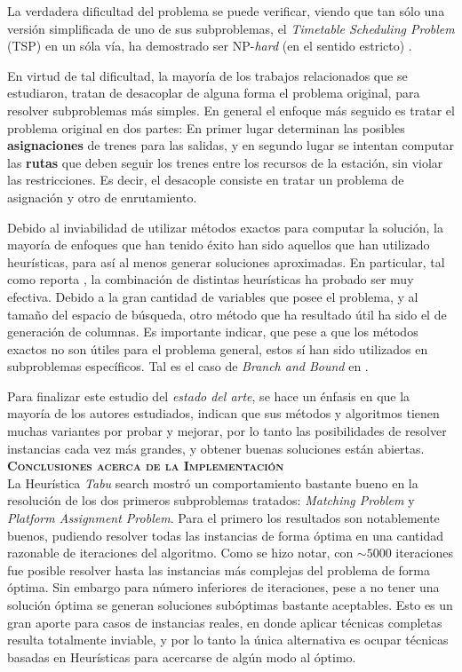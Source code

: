 \documentclass[letter, 10pt]{article}
\begin{document}
La verdadera dificultad del problema se puede verificar, viendo que tan sólo una versión simplificada de uno de sus subproblemas, el \textit{Timetable Scheduling Problem} (TSP) en un sóla vía, ha demostrado ser NP-\textit{hard} (en el sentido estricto) \cite{Caprara}.

En virtud de tal dificultad, la mayoría de los trabajos relacionados que se estudiaron, tratan de desacoplar de alguna forma el problema original, para resolver subproblemas más simples. En general el enfoque más seguido es tratar el problema original en dos partes: En primer lugar determinan las posibles \textbf{asignaciones} de trenes para las salidas, y en segundo lugar se intentan computar las \textbf{rutas} que deben seguir los trenes entre los recursos de la estación, sin violar las restricciones. Es decir, el desacople consiste en tratar un problema de asignación y otro de enrutamiento.

Debido al inviabilidad de utilizar métodos exactos para computar la solución, la mayoría de enfoques que han tenido éxito han sido aquellos que han utilizado heurísticas, para así al menos generar soluciones aproximadas. En particular, tal como reporta \cite{Higgins}, la combinación de distintas heurísticas ha probado ser muy efectiva.  Debido a la gran cantidad de variables que posee el problema, y al tamaño del espacio de búsqueda, otro método que ha resultado útil ha sido el de generación de columnas. Es importante indicar, que pese a que los métodos exactos no son útiles para el problema general, estos sí han sido utilizados en subproblemas específicos. Tal es el caso de \textit{Branch and Bound} en \cite{DAriano}.

Para finalizar este estudio del \textit{estado del arte}, se hace un énfasis en que la mayoría de los autores estudiados, indican que sus métodos y algoritmos tienen muchas variantes por probar y mejorar, por lo tanto las posibilidades de resolver instancias cada vez más grandes, y obtener buenas soluciones están abiertas. \\


\large{\textbf{{\textsc{Conclusiones acerca de la Implementación}}}}\\

La Heurística \textit{Tabu} search mostró un comportamiento bastante bueno en la resolución de los dos primeros subproblemas tratados: \textit{Matching Problem} y \textit{Platform Assignment Problem}. Para el primero los resultados son notablemente buenos, pudiendo resolver todas las instancias de forma óptima en una cantidad razonable de iteraciones del algoritmo. Como se hizo notar, con $\sim 5000$ iteraciones fue posible resolver hasta las instancias más complejas del problema de forma óptima. Sin embargo para número inferiores de iteraciones, pese a no tener una solución óptima se generan soluciones subóptimas bastante aceptables. Esto es un gran aporte para casos de instancias reales, en donde aplicar técnicas completas resulta totalmente inviable, y por lo tanto la única alternativa es ocupar técnicas basadas en Heurísticas para acercarse de algún modo al óptimo.
\end{document}
